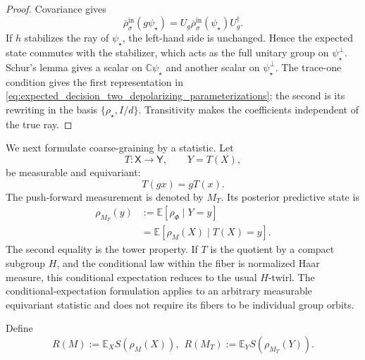 \documentclass[journal]{IEEEtran}
\begin{document}
\begin{proof}
Covariance gives
\begin{equation}
    \overline\rho_{\sigma}^{\mathrm{in}}(g\psi_\star)
    =
    U_g\overline\rho_{\sigma}^{\mathrm{in}}(\psi_\star)U_g^\dagger.
    \label{eq:expected_decision_covariance_proof}
\end{equation}
If \(h\) stabilizes the ray of \(\psi_\star\), the left-hand side is
unchanged.  Hence the expected state commutes with the stabilizer, which acts
as the full unitary group on \(\psi_\star^\perp\).  Schur's lemma gives a
scalar on \(\mathbb C\psi_\star\) and another scalar on
\(\psi_\star^\perp\).  The trace-one condition gives the first representation
in \eqref{eq:expected_decision_two_depolarizing_parameterizations}; the second
is its rewriting in the basis \(\{\rho_\star,I/d\}\).  Transitivity makes the
coefficients independent of the true ray.
\end{proof}

We next formulate coarse-graining by a statistic.  Let
\begin{equation}
    T:\mathsf X\longrightarrow\mathsf Y,
    \qquad
    Y=T(X),
    \label{eq:equivariant_statistic_coarse_graining_map}
\end{equation}
be measurable and equivariant:
\begin{equation}
    T(gx)=gT(x).
    \label{eq:equivariant_statistic_condition}
\end{equation}
The push-forward measurement is denoted by \(M_T\).  Its posterior predictive
state is
\begin{equation}
\begin{split}
    \rho_{M_T}(y)
    &:={\mathbb E}[\rho_\Phi\mid Y=y]                                          \\
    &={\mathbb E}[\rho_M(X)\mid T(X)=y].
\end{split}
\label{eq:coarse_posterior_state_conditional_expectation}
\end{equation}
The second equality is the tower property.  If \(T\) is the quotient by a
compact subgroup \(H\), and the conditional law within the fiber is normalized
Haar measure, this conditional expectation reduces to the usual \(H\)-twirl.
The conditional-expectation formulation applies to an arbitrary measurable
equivariant statistic and does not require its fibers to be individual group
orbits.

Define
\begin{equation}
    R(M):=\mathbb E_X S(\rho_M(X)),
    \hspace{5pt}
    R(M_T):=\mathbb E_Y S(\rho_{M_T}(Y)).
    \label{eq:fine_coarse_posterior_entropy_risks}
\end{equation}
\end{document}
